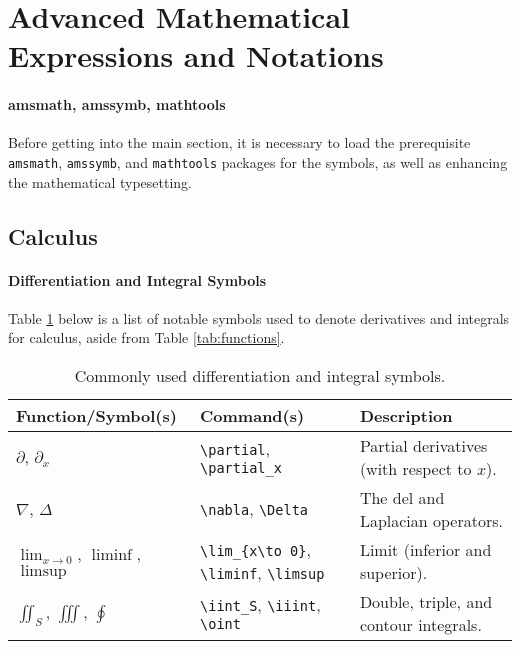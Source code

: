 \section{Advanced Mathematical Expressions and Notations}

\paragraph{amsmath, amssymb, mathtools}
Before getting into the main section, it is necessary to load the prerequisite \verb|amsmath|, \verb|amssymb|, and \verb|mathtools| packages for the symbols, as well as enhancing the mathematical typesetting.

\subsection{Calculus}

\paragraph{Differentiation and Integral Symbols}
Table \ref{tab:deintsymbol} below is a list of notable symbols used to denote derivatives and integrals for calculus, aside from Table \ref{tab:functions}.

\begin{table}[ht!]
\begin{tabularx}{\textwidth}{|p{}|>{\raggedright}p{}|X|}
\hline
Function/Symbol(s) & Command(s) & Description \\
\hline
$\partial$, $\partial_x$ & \texttt{\textbackslash partial}, \texttt{\textbackslash partial\_x} & Partial derivatives (with respect to $x$). \\
\hline
$\nabla$, $\Delta$ & \texttt{\textbackslash nabla}, \texttt{\textbackslash Delta} & The del and Laplacian operators. \\
\hline
$\lim_{x\to 0}$, $\liminf$, $\limsup$ & \texttt{\textbackslash lim\_\{x\textbackslash to 0\}}, \texttt{\textbackslash liminf}, \texttt{\textbackslash limsup} & Limit (inferior and superior). \\
\hline
$\iint_S$, $\iiint$, $\oint$ & \texttt{\textbackslash iint\_S}, \texttt{\textbackslash iiint}, \texttt{\textbackslash oint} & Double, triple\footnotemark, and contour integrals. \\
\hline
\end{tabularx}
\caption{Commonly used differentiation and integral symbols.}
\label{tab:deintsymbol}
\end{table}

